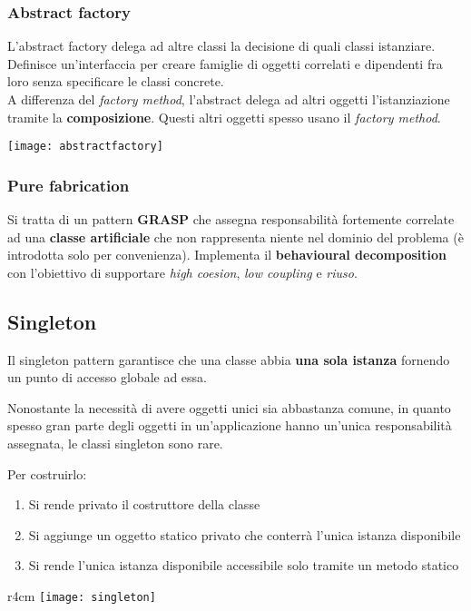\subsubsection{Abstract factory}
L'abstract factory delega ad altre classi la decisione di quali classi istanziare. Definisce un'interfaccia per creare famiglie di oggetti correlati e dipendenti fra loro senza specificare le classi concrete.\\
A differenza del \textit{factory method}, l'abstract delega ad altri oggetti l'istanziazione tramite la \textbf{composizione}. Questi altri oggetti spesso usano il \textit{factory method}.
\begin{center}
	\texttt{[image: abstractfactory]}
\end{center}

\subsubsection{Pure fabrication}
Si tratta di un pattern \textbf{GRASP} che assegna responsabilità fortemente correlate ad una \textbf{classe artificiale} che non rappresenta niente nel dominio del problema (è introdotta solo per convenienza). Implementa il \textbf{behavioural decomposition} con l'obiettivo di supportare \textit{high coesion}, \textit{low coupling} e \textit{riuso}.

\subsection{Singleton}
Il singleton pattern garantisce che una classe abbia \textbf{una sola istanza} fornendo un punto di accesso globale ad essa. 
\begin{note}
	Nonostante la necessità di avere oggetti unici sia abbastanza comune, in quanto spesso gran parte degli oggetti in un'applicazione hanno un'unica responsabilità assegnata, le classi singleton sono rare.
\end{note}
\noindent Per costruirlo:
\begin{enumerate}
	\item Si rende privato il costruttore della classe
	\item Si aggiunge un oggetto statico privato che conterrà l'unica istanza disponibile
	\item Si rende l'unica istanza disponibile accessibile solo tramite un metodo statico
\end{enumerate}

\begin{wrapfigure}[5]{r}{4cm}
	\vspace{-.5cm}
	\texttt{[image: singleton]}
\end{wrapfigure}
